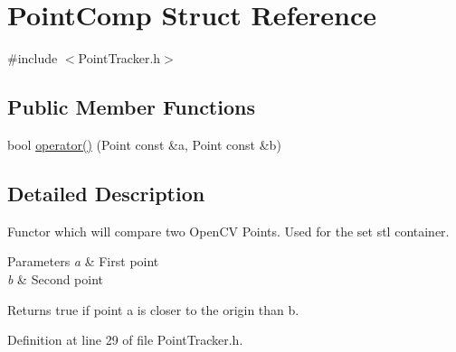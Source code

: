 \hypertarget{struct_point_comp}{
\section{\-Point\-Comp \-Struct \-Reference}
\label{struct_point_comp}
}


{\ttfamily \#include $<$\-Point\-Tracker.\-h$>$}

\subsection*{\-Public \-Member \-Functions}
\begin{DoxyCompactItemize}
\item 
bool \hyperlink{struct_point_comp_aa281978127904ee40fc4b1cb03730c24}{operator()} (\-Point const \&a, \-Point const \&b)
\end{DoxyCompactItemize}


\subsection{\-Detailed \-Description}
\-Functor which will compare two \-Open\-C\-V \-Points. \-Used for the set stl container. 
\begin{DoxyParams}{\-Parameters}
{\em a} & \-First point \\
\hline
{\em b} & \-Second point \\
\hline
\end{DoxyParams}
\begin{DoxyReturn}{\-Returns}
true if point a is closer to the origin than b. 
\end{DoxyReturn}


\-Definition at line 29 of file \-Point\-Tracker.\-h.



